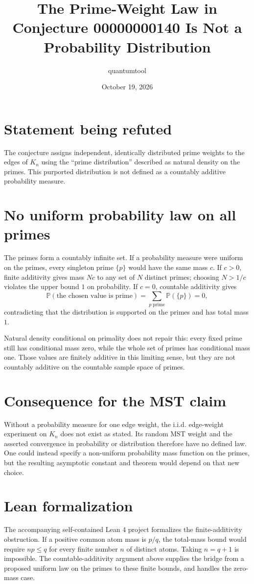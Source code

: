 \documentclass[11pt]{article}
\title{The Prime-Weight Law in Conjecture 00000000140 Is Not a Probability Distribution}
\author{quantumtool}
\date{October 19, 2026}
\begin{document}
\maketitle

\section*{Statement being refuted}
The conjecture assigns independent, identically distributed prime weights to the edges of $K_n$ using the ``prime distribution'' described as natural density on the primes. This purported distribution is not defined as a countably additive probability measure.

\section*{No uniform probability law on all primes}
The primes form a countably infinite set. If a probability measure were uniform on the primes, every singleton prime $\{p\}$ would have the same mass $c$. If $c>0$, finite additivity gives mass $Nc$ to any set of $N$ distinct primes; choosing $N>1/c$ violates the upper bound $1$ on probability. If $c=0$, countable additivity gives
\[
  \mathbb P(\text{the chosen value is prime})
  =\sum_{p\text{ prime}}\mathbb P(\{p\})=0,
\]
contradicting that the distribution is supported on the primes and has total mass $1$.

Natural density conditional on primality does not repair this: every fixed prime still has conditional mass zero, while the whole set of primes has conditional mass one. Those values are finitely additive in this limiting sense, but they are not countably additive on the countable sample space of primes.

\section*{Consequence for the MST claim}
Without a probability measure for one edge weight, the i.i.d. edge-weight experiment on $K_n$ does not exist as stated. Its random MST weight and the asserted convergence in probability or distribution therefore have no defined law. One could instead specify a non-uniform probability mass function on the primes, but the resulting asymptotic constant and theorem would depend on that new choice.

\section*{Lean formalization}
The accompanying self-contained Lean 4 project formalizes the finite-additivity obstruction. If a positive common atom mass is $p/q$, the total-mass bound would require $np\le q$ for every finite number $n$ of distinct atoms. Taking $n=q+1$ is impossible. The countable-additivity argument above supplies the bridge from a proposed uniform law on the primes to these finite bounds, and handles the zero-mass case.
\end{document}

